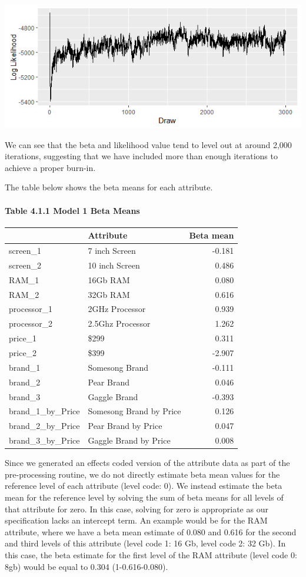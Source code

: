 \documentclass[]{article}
\let\oldparagraph\paragraph
\renewcommand{\paragraph}[1]{\oldparagraph{#1}\mbox{}}
\begin{document}
\includegraphics{images/model1_loglike.png}

We can see that the beta and likelihood value tend to level out at
around 2,000 iterations, suggesting that we have included more than
enough iterations to achieve a proper burn-in.

The table below shows the beta means for each attribute.

\newpage

\paragraph{Table 4.1.1 Model 1 Beta
Means}\label{table-4.1.1-model-1-beta-means}

\begin{longtable}[]{@{}llr@{}}
\toprule
& Attribute & Beta mean\tabularnewline
\midrule
\endhead
screen\_1 & 7 inch Screen & -0.181\tabularnewline
screen\_2 & 10 inch Screen & 0.486\tabularnewline
RAM\_1 & 16Gb RAM & 0.080\tabularnewline
RAM\_2 & 32Gb RAM & 0.616\tabularnewline
processor\_1 & 2GHz Processor & 0.939\tabularnewline
processor\_2 & 2.5Ghz Processor & 1.262\tabularnewline
price\_1 & \$299 & 0.311\tabularnewline
price\_2 & \$399 & -2.907\tabularnewline
brand\_1 & Somesong Brand & -0.111\tabularnewline
brand\_2 & Pear Brand & 0.046\tabularnewline
brand\_3 & Gaggle Brand & -0.393\tabularnewline
brand\_1\_by\_Price & Somesong Brand by Price & 0.126\tabularnewline
brand\_2\_by\_Price & Pear Brand by Price & 0.047\tabularnewline
brand\_3\_by\_Price & Gaggle Brand by Price & 0.008\tabularnewline
\bottomrule
\end{longtable}

Since we generated an effects coded version of the attribute data as
part of the pre-processing routine, we do not directly estimate beta
mean values for the reference level of each attribute (level code: 0).
We instead estimate the beta mean for the reference level by solving the
sum of beta means for all levels of that attribute for zero. In this
case, solving for zero is appropriate as our specification lacks an
intercept term. An example would be for the RAM attribute, where we have
a beta mean estimate of 0.080 and 0.616 for the second and third levels
of this attribute (level code 1: 16 Gb, level code 2: 32 Gb). In this
case, the beta estimate for the first level of the RAM attribute (level
code 0: 8gb) would be equal to 0.304 (1-0.616-0.080).
\end{document}
